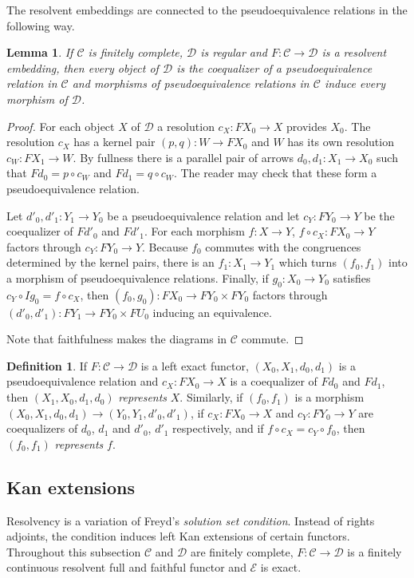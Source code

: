 \documentclass[sort&compress]{elsarticle}
\theoremstyle{plain}
\newtheorem{lemma}[theorem]{Lemma}
\theoremstyle{definition}
\newtheorem{defin}[theorem]{Definition}
\theoremstyle{remark}
\newcommand\cat\mathcal
\begin{document}
The resolvent embeddings are connected to the pseudoequivalence relations in the following way.

\begin{lemma} If $\cat C$ is finitely complete, $\cat D$ is regular and $F:\cat C \to\cat D$ is a resolvent embedding, then every object of $\cat D$ is the coequalizer of a pseudoequivalence relation in $\cat C$ and morphisms of pseudoequivalence relations in $\cat C$ induce every morphism of $\cat D$. \end{lemma}

\begin{proof} 
For each object $X$ of $\cat D$ a resolution $c_X:FX_0 \to X$ provides $X_0$. The resolution $c_X$ has a kernel pair $(p,q):W\to FX_0$ and $W$ has its own resolution $c_W:FX_1 \to W$. By fullness there is a parallel pair of arrows $d_0,d_1:X_1\to X_0$ such that $Fd_0 = p\circ c_W$ and $Fd_1 = q\circ c_W$. The reader may check that these form a pseudoequivalence relation.

Let $d'_0,d'_1:Y_1 \to Y_0$ be a pseudoequivalence relation and let $c_Y:FY_0 \to Y$ be the coequalizer of $Fd'_0$ and $Fd'_1$. For each morphism $f:X\to Y$, $f\circ c_X:FX_0 \to Y$ factors through $c_Y:FY_0 \to Y$. Because $f_0$ commutes with the congruences determined by the kernel pairs, there is an $f_1:X_1\to Y_1$ which turns $(f_0,f_1)$ into a morphism of pseudoequivalence relations. Finally, if $g_0:X_0\to Y_0$ satisfies $c_Y\circ Ig_0 = f\circ c_X$, then $(f_0,g_0): FX_0 \to FY_0\times FY_0$ factors through $(d'_0,d'_1):FY_1\to FY_0\times FU_0$ inducing an equivalence.

Note that faithfulness makes the diagrams in $\cat C$ commute.
\end{proof}

\begin{defin} If $F:\cat C\to\cat D$ is a left exact functor, $(X_0,X_1,d_0,d_1)$ is a pseudoequivalence relation and $c_X:FX_0 \to X$ is a coequalizer of $Fd_0$ and $Fd_1$, then $(X_1,X_0,d_1,d_0)$ \emph{represents} $X$. Similarly, if $(f_0,f_1)$ is a morphism $(X_0,X_1,d_0,d_1)\to (Y_0,Y_1,d'_0,d'_1)$, if $c_X:FX_0 \to X$ and $c_Y:FY_0 \to Y$ are coequalizers of $d_0$, $d_1$ and $d'_0$, $d'_1$ respectively, and if $f\circ c_X = c_Y\circ f_0$, then $(f_0,f_1)$ \emph{represents} $f$. \end{defin}


\subsection{Kan extensions}
Resolvency is a variation of Freyd's \emph{solution set condition}. Instead of rights adjoints, the condition induces left Kan extensions of certain functors. Throughout this subsection $\cat C$ and $\cat D$ are finitely complete, $F:\cat C\to\cat D$ is a finitely continuous resolvent full and faithful functor and $\cat E$ is exact.
\end{document}
